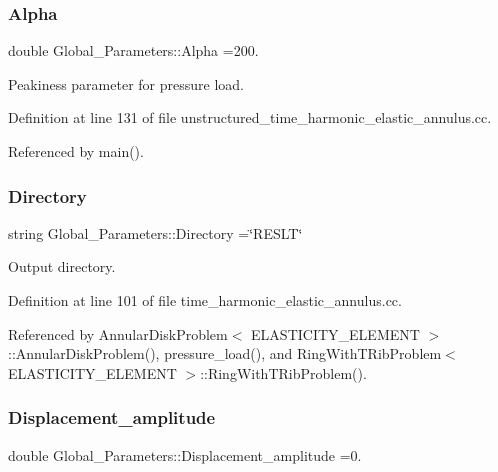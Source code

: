 \subsubsection{\texorpdfstring{Alpha}{Alpha}}
{\footnotesize\ttfamily double Global\+\_\+\+Parameters\+::\+Alpha =200.}



Peakiness parameter for pressure load. 



Definition at line 131 of file unstructured\+\_\+time\+\_\+harmonic\+\_\+elastic\+\_\+annulus.\+cc.



Referenced by main().

\mbox{\label{namespaceGlobal__Parameters_a301ab922df72030c660b21328d6caf76}} 
\subsubsection{\texorpdfstring{Directory}{Directory}}
{\footnotesize\ttfamily string Global\+\_\+\+Parameters\+::\+Directory =\char`\"{}R\+E\+S\+LT\char`\"{}}



Output directory. 



Definition at line 101 of file time\+\_\+harmonic\+\_\+elastic\+\_\+annulus.\+cc.



Referenced by Annular\+Disk\+Problem$<$ E\+L\+A\+S\+T\+I\+C\+I\+T\+Y\+\_\+\+E\+L\+E\+M\+E\+N\+T $>$\+::\+Annular\+Disk\+Problem(), pressure\+\_\+load(), and Ring\+With\+T\+Rib\+Problem$<$ E\+L\+A\+S\+T\+I\+C\+I\+T\+Y\+\_\+\+E\+L\+E\+M\+E\+N\+T $>$\+::\+Ring\+With\+T\+Rib\+Problem().

\mbox{\label{namespaceGlobal__Parameters_a0138eb659958d7d7d1afd12577becf82}} 
\subsubsection{\texorpdfstring{Displacement\+\_\+amplitude}{Displacement\_amplitude}}
{\footnotesize\ttfamily double Global\+\_\+\+Parameters\+::\+Displacement\+\_\+amplitude =0.}



